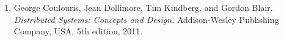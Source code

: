 \documentclass[times, 10pt,twocolumn]{article}
\begin{document}
\label{subsec:ref}
\begin{enumerate}
\item George Coulouris, Jean Dollimore, Tim Kindberg, and Gordon Blair. {\it Distributed Systems: Concepts and Design.} Addison-Wesley Publishing Company, USA, 5th edition, 2011.
\end{enumerate}



\end{document}
